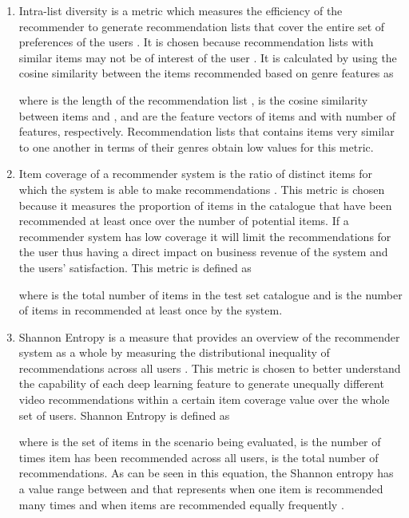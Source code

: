 \documentclass[review]{elsarticle}
\begin{document}
\begin{enumerate}


    \item Intra-list diversity is a metric which measures the efficiency of the recommender to generate recommendation lists that cover the entire set of preferences of the users \citep{silveira2019good}. It is chosen because recommendation lists with similar items may not be of interest of the user \citep{silveira2019good}. It is calculated by using the cosine similarity between the items recommended based on genre features as \citep{deldjoo2019movie, silveira2019good}
    
          
    
    
    
    where  is the length of the recommendation list ,  is the cosine similarity between items  and , and   are the feature vectors of items  and  with  number of features, respectively. Recommendation lists that contains items very similar to one another in terms of their genres obtain low values for this metric.\\ 
    
    
    \item Item coverage of a recommender system is the ratio of distinct items for which the system is able to make recommendations \citep{silveira2019good}. This metric is chosen because it measures the proportion of items in the catalogue that have been recommended at least once over the number of potential items. If a recommender system has low coverage it will limit the recommendations for the user thus having a direct impact on business revenue of the system and the users' satisfaction. This metric is defined as \citep{deldjoo2019movie, silveira2019good}

    
    where  is the total number of items in the test set catalogue and  is the number of items in  recommended at least once by the system.\\
    
    
    \item Shannon Entropy is a measure that provides an overview of the recommender system as a whole by measuring the distributional inequality of recommendations across all users \citep{deldjoo2019movie}. This metric is chosen to better understand the capability of each deep learning feature to generate unequally different video recommendations within a certain item coverage value over the whole set of users. Shannon Entropy is defined as \citep{deldjoo2019movie}
    
     
 
 
 
    where  is the set of items in the scenario being evaluated,  is the number of times item  has been recommended across all users,  is the total number of recommendations. As can be seen in this equation, the Shannon entropy has a value range between  and  that represents when one item is recommended many times and when  items are recommended equally frequently \citep{shani2011evaluating}.    
    
    
\end{enumerate}
\end{document}
